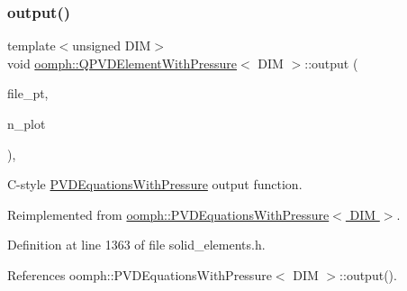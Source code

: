 \mbox{\label{classoomph_1_1QPVDElementWithPressure_a129f52703db667b9b67a2aa7a6f7fb3e}} 
\subsubsection{\texorpdfstring{output()}{output()}\hspace{0.1cm}{\footnotesize\ttfamily [4/4]}}
{\footnotesize\ttfamily template$<$unsigned D\+IM$>$ \\
void \hyperlink{classoomph_1_1QPVDElementWithPressure}{oomph\+::\+Q\+P\+V\+D\+Element\+With\+Pressure}$<$ D\+IM $>$\+::output (\begin{DoxyParamCaption}\item[{F\+I\+LE $\ast$}]{file\+\_\+pt,  }\item[{const unsigned \&}]{n\+\_\+plot }\end{DoxyParamCaption})\hspace{0.3cm}{\ttfamily [inline]}, {\ttfamily [virtual]}}



C-\/style \hyperlink{classoomph_1_1PVDEquationsWithPressure}{P\+V\+D\+Equations\+With\+Pressure} output function. 



Reimplemented from \hyperlink{classoomph_1_1PVDEquationsWithPressure_a27aee23c253bef90a7f389acd376fd27}{oomph\+::\+P\+V\+D\+Equations\+With\+Pressure$<$ D\+I\+M $>$}.



Definition at line 1363 of file solid\+\_\+elements.\+h.



References oomph\+::\+P\+V\+D\+Equations\+With\+Pressure$<$ D\+I\+M $>$\+::output().

\mbox{\label{classoomph_1_1QPVDElementWithPressure_a50241b9156808fb68182405335438769}} 
